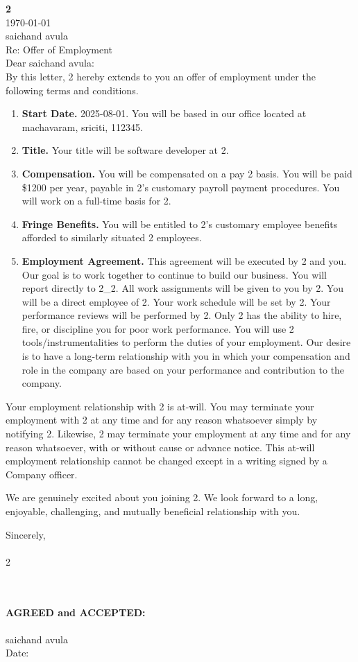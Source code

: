 \documentclass[12pt]{article}
\begin{document}
\textbf{2} \\
\today \\
saichand avula \\
Re: Offer of Employment \\
Dear saichand avula: \\

By this letter, 2 hereby extends to you an offer of employment under the following terms and conditions.

\begin{enumerate}
    \item \textbf{Start Date.} 2025-08-01. You will be based in our office located at machavaram, sriciti, 112345.
    \item \textbf{Title.} Your title will be software developer at 2.
    \item \textbf{Compensation.} You will be compensated on a pay 2 basis. You will be paid \$1200 per year, payable in 2's customary payroll payment procedures. You will work on a full-time basis for 2.
    \item \textbf{Fringe Benefits.} You will be entitled to 2's customary employee benefits afforded to similarly situated 2 employees.
    \item \textbf{Employment Agreement.} This agreement will be executed by 2 and you. Our goal is to work together to continue to build our business. You will report directly to 2_2. All work assignments will be given to you by 2. You will be a direct employee of 2. Your work schedule will be set by 2. Your performance reviews will be performed by 2. Only 2 has the ability to hire, fire, or discipline you for poor work performance. You will use 2 tools/instrumentalities to perform the duties of your employment. Our desire is to have a long-term relationship with you in which your compensation and role in the company are based on your performance and contribution to the company.
\end{enumerate}

Your employment relationship with 2 is at-will. You may terminate your employment with 2 at any time and for any reason whatsoever simply by notifying 2. Likewise, 2 may terminate your employment at any time and for any reason whatsoever, with or without cause or advance notice. This at-will employment relationship cannot be changed except in a writing signed by a Company officer.

We are genuinely excited about you joining 2. We look forward to a long, enjoyable, challenging, and mutually beneficial relationship with you.

\vspace{0.5in}

Sincerely, \\
[HR Signature] \\
2 \\
[HR Name] \\
[HR Title] \\

\vspace{0.5in}

\textbf{AGREED and ACCEPTED:} \\
\vspace{0.5in} \\
saichand avula \\
Date: \underline{\hspace{2in}}
\end{document}
